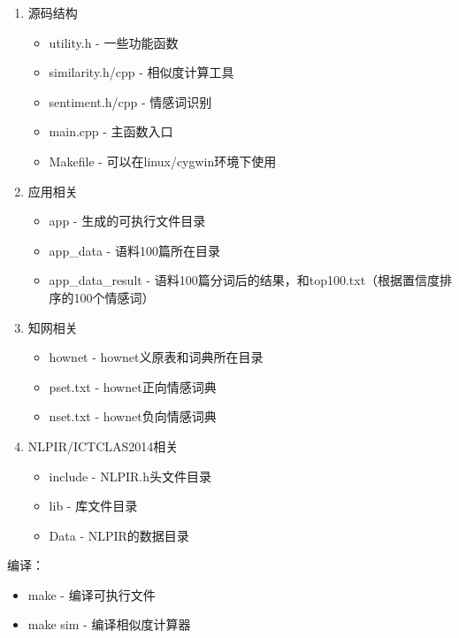 \documentclass[11pt,a4paper]{article}
\begin{document}
\begin{enumerate}
\item 源码结构 

\begin{itemize}
\item utility.h         - 一些功能函数 
\item similarity.h/cpp  - 相似度计算工具
\item sentiment.h/cpp   - 情感词识别
\item main.cpp          - 主函数入口
\item Makefile          - 可以在linux/cygwin环境下使用 
\end{itemize}

\item 应用相关

\begin{itemize}
\item app               - 生成的可执行文件目录
\item app\_data          - 语料100篇所在目录
\item app\_data\_result   - 语料100篇分词后的结果，和top100.txt（根据置信度排序的100个情感词）
\end{itemize}

\item 知网相关

\begin{itemize}
\item hownet            - hownet义原表和词典所在目录
\item pset.txt          - hownet正向情感词典
\item nset.txt          - hownet负向情感词典
\end{itemize}

\item NLPIR/ICTCLAS2014相关

\begin{itemize}
\item include           - NLPIR.h头文件目录
\item lib               - 库文件目录
\item Data              - NLPIR的数据目录
\end{itemize}

\end{enumerate}

编译：

\begin{itemize}
\item make     - 编译可执行文件
\item make sim - 编译相似度计算器
\end{itemize}
\end{document}
